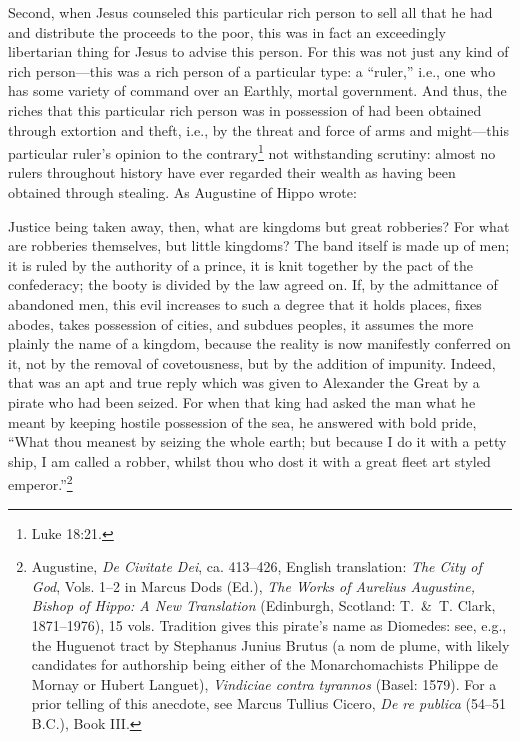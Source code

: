 \documentclass[letterpaper,12pt]{article}
\newenvironment{squote}
  {\small\quote}
  {\endquote\normalsize}
\begin{document}
Second, when Jesus counseled this particular rich person to sell all that he had and distribute the proceeds to the poor, this was in fact an exceedingly libertarian thing for Jesus to advise this person. For this was not just any kind of rich person---this was a rich person of a particular type: a ``ruler,'' i.e., one who has some variety of command over an Earthly, mortal government. And thus, the riches that this particular rich person was in possession of had been obtained through extortion and theft, i.e., by the threat and force of arms and might---this particular ruler's opinion to the contrary\footnote{Luke 18:21.} not withstanding scrutiny: almost no rulers throughout history have ever regarded their wealth as having been obtained through stealing. As Augustine of Hippo wrote:

\begin{squote}
Justice being taken away, then, what are kingdoms but great robberies? For what are robberies themselves, but little kingdoms? The band itself is made up of men; it is ruled by the authority of a prince, it is knit together by the pact of the confederacy; the booty is divided by the law agreed on. If, by the admittance of abandoned men, this evil increases to such a degree that it holds places, fixes abodes, takes possession of cities, and subdues peoples, it assumes the more plainly the name of a kingdom, because the reality is now manifestly conferred on it, not by the removal of covetousness, but by the addition of impunity. Indeed, that was an apt and true reply which was given to Alexander the Great by a pirate who had been seized. For when that king had asked the man what he meant by keeping hostile possession of the sea, he answered with bold pride, ``What thou meanest by seizing the whole earth; but because I do it with a petty ship, I am called a robber, whilst thou who dost it with a great fleet art styled emperor.''\footnote{Augustine, \emph{De Civitate Dei}, ca. 413--426, English translation: \emph{The City of God}, Vols. 1--2 in Marcus Dods (Ed.), \emph{The Works of Aurelius Augustine, Bishop of Hippo: A New Translation} (Edinburgh, Scotland: T.~\&~T. Clark, 1871--1976), 15 vols. Tradition gives this pirate's name as Diomedes: see, e.g., the Huguenot tract by Stephanus Junius Brutus (a nom de plume, with likely candidates for authorship being either of the Monarchomachists Philippe de Mornay or Hubert Languet), \emph{Vindiciae contra tyrannos} (Basel: 1579). For a prior telling of this anecdote, see Marcus Tullius Cicero, \emph{De re publica} (54--51 B.C.), Book III.}
\end{squote}
\end{document}
